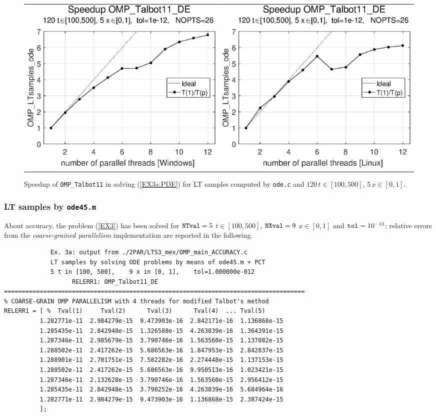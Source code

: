 \documentclass[a4paper,10pt]{report}%
\begin{document}
\begin{figure}[htb]
\centering
\begin{tabular}{cc} %
\includegraphics[height=0.2\textwidth]{./FIGS/EX3a/EX3a_ode_speedup_11_Windows.eps} &
\includegraphics[height=0.2\textwidth]{./FIGS/EX3a/EX3a_ode_speedup_11_Linux.eps}
\end{tabular}
\caption{\small Speedup of {\tt OMP\_Talbot11} in solving (\ref{EX3a:PDE}) for LT samples computed by
{\tt ode.c} and $120\,t\in[100,500]$, $5\,x\in[0,1]$.}
\label{PAR_EX3a_speedup_ode}
\end{figure}


\subsubsection{LT samples by {\tt ode45.m}}
About accuracy, the problem (\ref{EX3}) has been solved for ${\tt NTval}=5$ $t\in[100, 500]$, ${\tt NXval}=9$
$x\in[0,1]$ and ${\tt tol}=10^{-12}$; relative errors from the {\em coarse-grained parallelism} implementation
are reported in the following.
\begin{lstlisting}
             Ex. 3a: output from ./2PAR/LTS3_mex/OMP_main_ACCURACY.c
             LT samples by solving ODE problems by means of ode45.m + PCT
             5 t in [100, 500],    9 x in [0, 1],    tol=1.000000e-012
                   RELERR1: OMP_Talbot11_DE
====================================================================================
% COARSE-GRAIN OMP PARALLELISM with 4 threads for modified Talbot's method
RELERR1 = [ %  Tval(1)     Tval(2)      Tval(3)      Tval(4)  ... Tval(5)
          1.282771e-11  2.984279e-15  9.473903e-16  2.842171e-16  1.136868e-15
          1.285435e-11  2.842948e-15  1.326588e-15  4.263839e-16  1.364391e-15
          1.287346e-11  2.985679e-15  3.790746e-16  1.563560e-15  1.137082e-15
          1.288502e-11  2.417262e-15  5.686563e-16  1.847953e-15  2.842837e-15
          1.288901e-11  2.701751e-15  7.582282e-16  2.274448e-15  1.137153e-15
          1.288502e-11  2.417262e-15  5.686563e-16  9.950513e-16  1.023421e-15
          1.287346e-11  2.132628e-15  3.790746e-16  1.563560e-15  2.956412e-15
          1.285435e-11  2.842948e-15  3.790252e-16  4.263839e-16  5.684964e-16
          1.282771e-11  2.984279e-15  9.473903e-16  1.136868e-15  2.387424e-15
          ];
\end{lstlisting}
\end{document}
